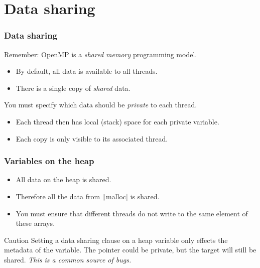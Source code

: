 \documentclass{beamer}
\begin{document}

\section{Data sharing}
\begin{frame}
\frametitle{Data sharing}
Remember: OpenMP is a \emph{shared memory} programming model.
\begin{itemize}
  \item By default, all data is available to all threads.
  \item There is a single copy of \emph{shared} data.
\end{itemize}

\vfill

You must specify which data should be \emph{private} to each thread.
\begin{itemize}
  \item Each thread then has local (stack) space for each private variable.
  \item Each copy is only visible to its associated thread.
\end{itemize}

\end{frame}


\begin{frame}
\frametitle{Variables on the heap}
\begin{itemize}
  \item All data on the heap is shared.
  \item Therefore all the data from \texttt|malloc| is shared.
  \item You must ensure that different threads do not write to the same element of these arrays.
\end{itemize}

\begin{alertblock}{Caution}
Setting a data sharing clause on a heap variable only effects the metadata of the variable.
The pointer could be private, but the target will still be shared.
\textit{This is a common source of bugs.}
\end{alertblock}
\end{frame}

\end{document}
